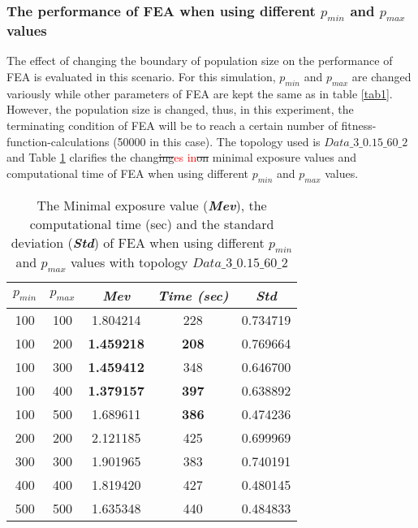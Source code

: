 \documentclass[final]{elsarticle}
\begin{document}
\subsubsection{The performance of FEA when using different $ p_{min} $ and $ p_{max} $ values}
The effect of changing the boundary of population size on the performance of FEA is evaluated in this scenario. For this simulation, $ p_{min} $ and $ p_{max} $ are changed variously while other parameters of FEA are kept the same as in table \ref{tab1}. However, the population size is changed, thus, in this experiment, the terminating condition of FEA will be to reach a certain number of fitness-function-calculations (50000 in this case). The topology used is $ Data\_3\_0.15\_60\_2 $ and Table \ref{tab2} clarifies the chang\sout{ing}\textcolor{red}{es} \textcolor{red}{in}\sout{on} minimal exposure values and computational time of FEA when using different $ p_{min} $ and $ p_{max} $ values.
\begin{table}
	\caption{The Minimal exposure value (\textbf{\textit{Mev}}), the computational time (sec) and the standard deviation (\textbf{\textit{Std}}) of FEA when using different $ p_{min} $ and $ p_{max} $ values with topology $ Data\_3\_0.15\_60\_2 $  }
	\label{tab2}       %
	\begin{center}
		\renewcommand{\arraystretch}{1.5}
		\begin{tabular}{|c|c|c|c|c|}
			\hline
			\textbf{$p_{min}$} & \textbf{$p_{max}$ } & \textit{\textbf{Mev}} &\textit{ \textbf{Time (sec)}} & \textit{\textbf{Std}} \\
			\hline
			100 & 100 &1.804214 &228 &0.734719\\
			\hline
			100 & 200 &\textbf{1.459218} &\textbf{208} &0.769664\\
			\hline
			100 & 300 &\textbf{1.459412} &348 &0.646700\\
			\hline
			100 & 400 &\textbf{1.379157} &\textbf{397} &0.638892\\
			\hline
			100 & 500 &1.689611 &\textbf{386} &0.474236\\
			\hline\hline
			200 & 200 &2.121185 &425 &0.699969\\\hline
			300 & 300 &1.901965 &383 &0.740191\\\hline
			400 & 400 &1.819420 &427 &0.480145\\\hline
			500 & 500 &1.635348 &440 &0.484833\\\hline
		\end{tabular}
	\end{center}
\end{table}
\end{document}
